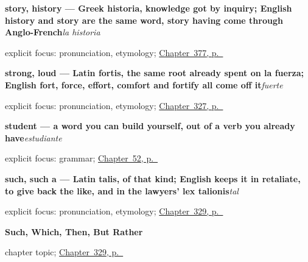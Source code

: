 \noindent\begin{minipage}[t]{\linewidth}
\raggedright
\textbf{story, history — Greek historia, knowledge got by inquiry; English history and story are the same word, story having come through Anglo-French}\enspace\emph{la historia}\par
\footnotesize explicit focus: pronunciation, etymology; \hyperref[ch:la-letra-y-la-frase]{Chapter~377, p.~\pageref*{ch:la-letra-y-la-frase}}
\end{minipage}\par\smallskip

\noindent\begin{minipage}[t]{\linewidth}
\raggedright
\textbf{strong, loud — Latin fortis, the same root already spent on la fuerza; English fort, force, effort, comfort and fortify all come off it}\enspace\emph{fuerte}\par
\footnotesize explicit focus: pronunciation, etymology; \hyperref[ch:despierto-y-sano]{Chapter~327, p.~\pageref*{ch:despierto-y-sano}}
\end{minipage}\par\smallskip

\noindent\begin{minipage}[t]{\linewidth}
\raggedright
\textbf{student — a word you can build yourself, out of a verb you already have}\enspace\emph{estudiante}\par
\footnotesize explicit focus: grammar; \hyperref[ch:estudiante]{Chapter~52, p.~\pageref*{ch:estudiante}}
\end{minipage}\par\smallskip

\noindent\begin{minipage}[t]{\linewidth}
\raggedright
\textbf{such, such a — Latin talis, of that kind; English keeps it in retaliate, to give back the like, and in the lawyers' lex talionis}\enspace\emph{tal}\par
\footnotesize explicit focus: pronunciation, etymology; \hyperref[ch:tal-y-salvo]{Chapter~329, p.~\pageref*{ch:tal-y-salvo}}
\end{minipage}\par\smallskip

\noindent\begin{minipage}[t]{\linewidth}
\raggedright
\textbf{Such, Which, Then, But Rather}\par
\footnotesize chapter topic; \hyperref[ch:tal-y-salvo]{Chapter~329, p.~\pageref*{ch:tal-y-salvo}}
\end{minipage}\par\smallskip

